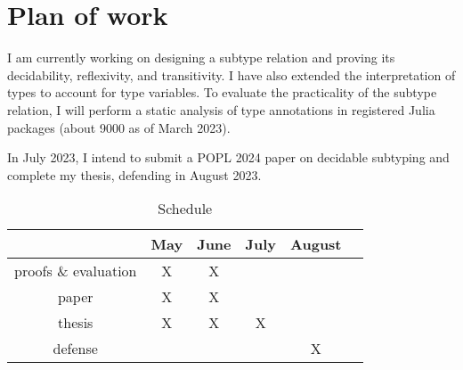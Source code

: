 \chapter{Plan of work}\label{chap:6}

I am currently working on designing a subtype relation
and proving its decidability, reflexivity, and transitivity.
I have also extended the interpretation of types to account for type variables.
To evaluate the practicality of the subtype relation,
I will perform a static analysis of type annotations in registered Julia
packages (about 9000 as of March 2023).

In July 2023, I intend to submit a POPL 2024 paper on decidable subtyping
and complete my thesis, defending in August 2023.

\begin{table}[h]
  \caption{Schedule}
  \vspace*{0.25em}
  \centering\footnotesize
  \begin{tabular}{c|ccccc}
  \toprule
  & May & June & July & August \\
  \midrule
  proofs \& evaluation & X & X & & \\
  paper & X & X & & \\
  thesis & X & X & X & \\
  defense & & & & X \\
\end{tabular}
\end{table}




